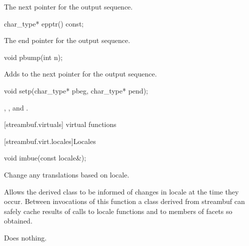 \begin{itemdescr}
\pnum
\returns
The next pointer for the output sequence.
\end{itemdescr}

%
\begin{itemdecl}
char_type* epptr() const;
\end{itemdecl}

\begin{itemdescr}
\pnum
\returns
The end pointer for the output sequence.
\end{itemdescr}

%
\begin{itemdecl}
void pbump(int n);
\end{itemdecl}

\begin{itemdescr}
\pnum
\effects
Adds  to the next pointer for the output sequence.
\end{itemdescr}

%
\begin{itemdecl}
void setp(char_type* pbeg, char_type* pend);
\end{itemdecl}

\begin{itemdescr}
\pnum
\postconditions
{},
,
and
.
\end{itemdescr}

[streambuf.virtuals]{ virtual functions}

[streambuf.virt.locales]{Locales}

%
\begin{itemdecl}
void imbue(const locale&);
\end{itemdecl}

\begin{itemdescr}
\pnum
\effects
Change any translations based on locale.

\pnum
\remarks
Allows the derived class to be informed of changes in locale at the
time they occur.
Between invocations of this function a class derived
from streambuf can safely cache results of calls to locale functions
and to members of facets so obtained.

\pnum
{}
Does nothing.
\end{itemdescr}

